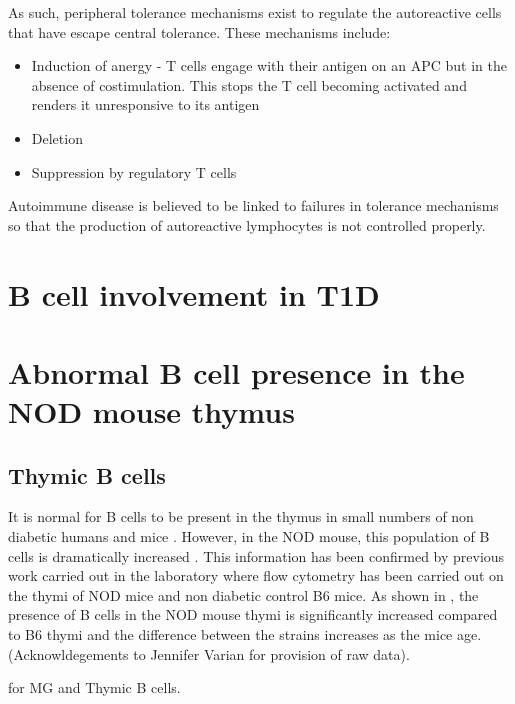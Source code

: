 As such, peripheral tolerance mechanisms exist to regulate the autoreactive cells that have escape central tolerance.
These mechanisms include:
\begin{itemize}
\item Induction of anergy - T cells engage with their antigen on an APC but in the absence of costimulation. This stops the T cell becoming activated and renders it unresponsive to its antigen\citep{Abbas2004}
\item Deletion\citep{Abbas2004}
\item Suppression by regulatory T cells\citep{Abbas2004}
\end{itemize}

Autoimmune disease is believed to be linked to failures in tolerance mechanisms so that the production of autoreactive lymphocytes is not controlled properly.



\section{B cell involvement in T1D}
\label{sec:BcellsinT1D}
\section{Abnormal B cell presence in the NOD mouse thymus}
\subsection{Thymic B cells}



It is normal for B cells to be present in the thymus in small numbers \citep{Isaacson1987, Akashi2000} of non diabetic humans \citep{Isaacson1987} and mice \citep{Akashi2000}. 
However, in the NOD mouse, this population of B cells is dramatically increased \citep{OReilly1994}.
This information has been confirmed by previous work carried out in the laboratory where flow cytometry has been carried out on the thymi of NOD mice and non diabetic control B6 mice.
As shown in , the presence of B cells in the NOD mouse thymi is significantly increased compared to B6 thymi and the difference between the strains increases as the mice age. (Acknowldegements to Jennifer Varian for provision of raw data). 

  \citep{Christensson1998} for MG and Thymic B cells.

